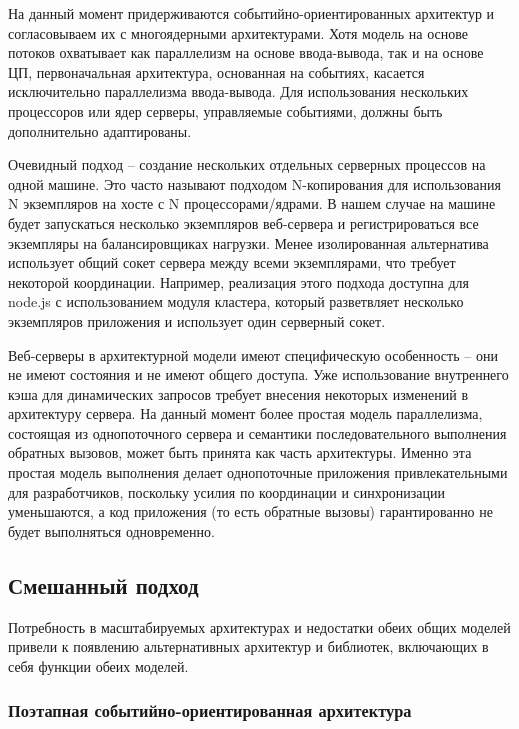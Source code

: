 На данный момент придерживаются событийно-ориентированных архитектур и согласовываем их с многоядерными архитектурами. Хотя модель на основе потоков охватывает как параллелизм на основе ввода-вывода, так и на основе ЦП, первоначальная архитектура, основанная на событиях, касается исключительно параллелизма ввода-вывода. Для использования нескольких процессоров или ядер серверы, управляемые событиями, должны быть дополнительно адаптированы.

Очевидный подход -- создание нескольких отдельных серверных процессов на одной машине. Это часто называют подходом N-копирования для использования N экземпляров на хосте с N процессорами/ядрами. В нашем случае на машине будет запускаться несколько экземпляров веб-сервера и регистрироваться все экземпляры на балансировщиках нагрузки. Менее изолированная альтернатива использует общий сокет сервера между всеми экземплярами, что требует некоторой координации. Например, реализация этого подхода доступна для node.js с использованием модуля кластера, который разветвляет несколько экземпляров приложения и использует один серверный сокет.

Веб-серверы в архитектурной модели имеют специфическую особенность -- они не имеют состояния и не имеют общего доступа. Уже использование внутреннего кэша для динамических запросов требует внесения некоторых изменений в архитектуру сервера. На данный момент более простая модель параллелизма, состоящая из однопоточного сервера и семантики последовательного выполнения обратных вызовов, может быть принята как часть архитектуры. Именно эта простая модель выполнения делает однопоточные приложения привлекательными для разработчиков, поскольку усилия по координации и синхронизации уменьшаются, а код приложения (то есть обратные вызовы) гарантированно не будет выполняться одновременно.

\subsection{Смешанный подход}

Потребность в масштабируемых архитектурах и недостатки обеих общих моделей привели к появлению альтернативных архитектур и библиотек, включающих в себя функции обеих моделей.

\subsubsection{Поэтапная событийно-ориентированная архитектура}

